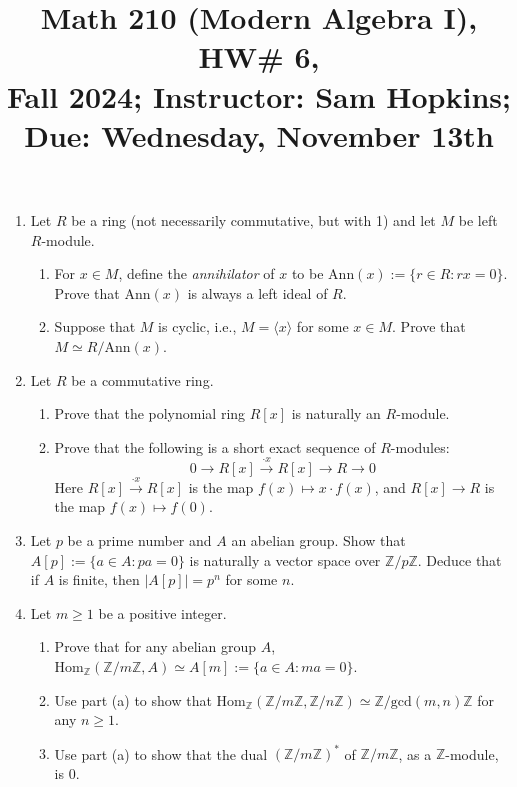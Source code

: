 \documentclass[11pt]{article}
\title{Math 210 (Modern Algebra I), HW\# 6, \\ {\normalsize Fall 2024; Instructor: Sam Hopkins; Due: Wednesday, November 13th}}
\date{}
\begin{document}
\maketitle

\thispagestyle{empty}

\begin{enumerate}

\item Let $R$ be a ring (not necessarily commutative, but with 1) and let $M$ be left $R$-module. 
\begin{enumerate}
\item For $x \in M$, define the \emph{annihilator} of $x$ to be $\mathrm{Ann}(x) := \{r \in R\colon rx = 0\}$. Prove that $\mathrm{Ann}(x)$ is always a left ideal of $R$.
\item Suppose that $M$ is cyclic, i.e., $M = \langle x \rangle$ for some $x \in M$. Prove that $M \simeq R/\mathrm{Ann}(x)$.
\end{enumerate}

\item Let $R$ be a commutative ring.
\begin{enumerate}
\item Prove that the polynomial ring $R[x]$ is naturally an $R$-module.
\item Prove that the following is a short exact sequence of $R$-modules:
\[ 0 \to R[x] \xrightarrow{\cdot x} R[x] \to R \to 0 \]
Here $R[x] \xrightarrow{\cdot x} R[x]$ is the map $f(x) \mapsto x \cdot f(x)$, and $R[x] \to R$ is the map $f(x) \mapsto f(0)$.
\end{enumerate}

\item Let $p$ be a prime number and $A$ an abelian group. Show that $A[p] := \{a \in A\colon pa = 0\}$ is naturally a vector space over $\mathbb{Z}/p\mathbb{Z}$. Deduce that if $A$ is finite, then $|A[p]| = p^n$ for some $n$.

\item Let $m \geq 1$ be a positive integer.
\begin{enumerate} 
\item Prove that for any abelian group $A$, $\mathrm{Hom}_{\mathbb{Z}}(\mathbb{Z}/m\mathbb{Z},A) \simeq A[m] := \{a \in A\colon ma = 0\}$.
\item Use part (a) to show that $\mathrm{Hom}_{\mathbb{Z}}(\mathbb{Z}/m\mathbb{Z}, \mathbb{Z}/n\mathbb{Z}) \simeq \mathbb{Z}/\mathrm{gcd}(m,n)\mathbb{Z}$ for any $n \geq 1$.
\item Use part (a) to show that the dual $(\mathbb{Z}/m\mathbb{Z})^*$ of $\mathbb{Z}/m\mathbb{Z}$, as a $\mathbb{Z}$-module, is $0$.
\end{enumerate}


\end{enumerate}
\end{document}
